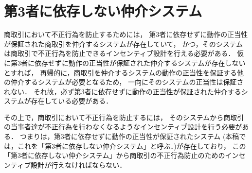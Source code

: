 \section{第3者に依存しない仲介システム}
  商取引において不正行為を防止するためには，
  第3者に依存せずに動作の正当性が保証された商取引を仲介するシステムが存在していて，
  かつ，そのシステムは商取引で不正行為を防止できるインセンティブ設計を行える必要がある．
  仮に第3者に依存せずに動作の正当性が保証された仲介するシステムが存在しないとすれば，
  再帰的に，商取引を仲介するシステムの動作の正当性を保証する他の仲介するシステムが必要となるため，
  一向にそのシステムの正当性は保証されない．
  それ故，必ず第3者に依存せずに動作の正当性が保証された仲介するシステムが存在している必要がある．
  
  その上で，商取引において不正行為を防止するには，
  そのシステムから商取引の当事者達が不正行為を行わなくなるようなインセンティブ設計を行う必要がある．
  つまりは，第3者に依存せずに動作の正当性が保証されたシステム
  (本稿では，これを「第3者に依存しない仲介システム」と呼ぶ．)が存在しており，
  この「第3者に依存しない仲介システム」から商取引の不正行為防止のためのインセンティブ設計が行えなければならない．

